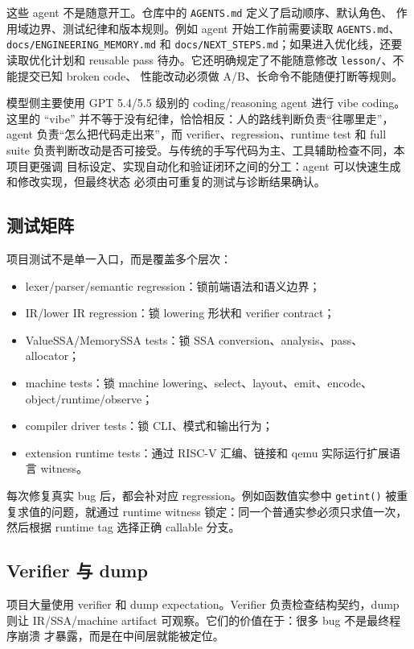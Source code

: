 \documentclass[UTF8,a4paper,11pt]{ctexart}
\begin{document}
这些 agent 不是随意开工。仓库中的 \texttt{AGENTS.md} 定义了启动顺序、默认角色、
作用域边界、测试纪律和版本规则。例如 agent 开始工作前需要读取
\texttt{AGENTS.md}、\texttt{docs/ENGINEERING\_MEMORY.md} 和
\texttt{docs/NEXT\_STEPS.md}；如果进入优化线，还要读取优化计划和 reusable pass
待办。它还明确规定了不能随意修改 \texttt{lesson/}、不能提交已知 broken code、
性能改动必须做 A/B、长命令不能随便打断等规则。

模型侧主要使用 GPT 5.4/5.5 级别的 coding/reasoning agent 进行 vibe coding。
这里的 ``vibe'' 并不等于没有纪律，恰恰相反：人的路线判断负责“往哪里走”，agent
负责“怎么把代码走出来”，而 verifier、regression、runtime test 和 full suite
负责判断改动是否可接受。与传统的手写代码为主、工具辅助检查不同，本项目更强调
目标设定、实现自动化和验证闭环之间的分工：agent 可以快速生成和修改实现，但最终状态
必须由可重复的测试与诊断结果确认。

\subsection{测试矩阵}

项目测试不是单一入口，而是覆盖多个层次：

\begin{itemize}
  \item lexer/parser/semantic regression：锁前端语法和语义边界；
  \item IR/lower IR regression：锁 lowering 形状和 verifier contract；
  \item ValueSSA/MemorySSA tests：锁 SSA conversion、analysis、pass、allocator；
  \item machine tests：锁 machine lowering、select、layout、emit、encode、object/runtime/observe；
  \item compiler driver tests：锁 CLI、模式和输出行为；
  \item extension runtime tests：通过 RISC-V 汇编、链接和 qemu 实际运行扩展语言 witness。
\end{itemize}

每次修复真实 bug 后，都会补对应 regression。例如函数值实参中 \texttt{getint()}
被重复求值的问题，就通过 runtime witness 锁定：同一个普通实参必须只求值一次，
然后根据 runtime tag 选择正确 callable 分支。

\subsection{Verifier 与 dump}

项目大量使用 verifier 和 dump expectation。Verifier 负责检查结构契约，dump
则让 IR/SSA/machine artifact 可观察。它们的价值在于：很多 bug 不是最终程序崩溃
才暴露，而是在中间层就能被定位。
\end{document}
